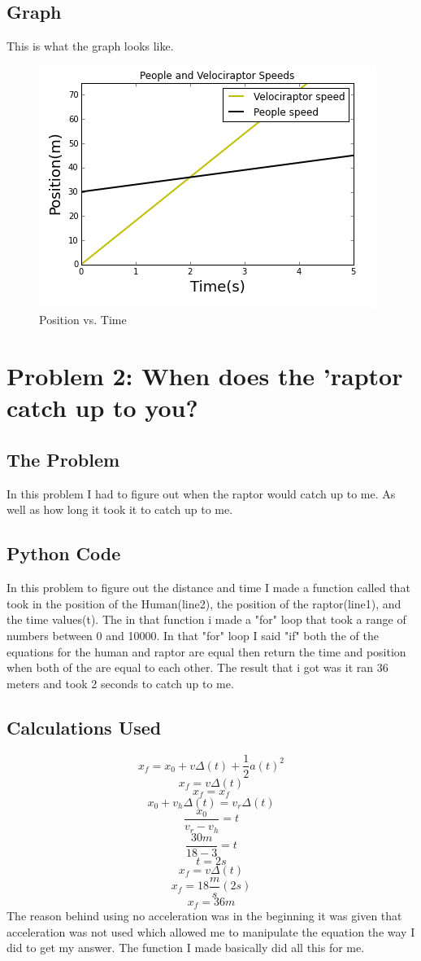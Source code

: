 \documentclass[twocolumn]{revtex4}
\begin{document}
\subsection{Graph}
This is what the graph looks like.
\begin{figure}[h!]
\caption{Position vs. Time}
\centering
\includegraphics[width=.5\textwidth]{PvT_graph.png}
\end{figure}


\section{Problem 2: When does the 'raptor catch up to you?}

\subsection{The Problem}
In this problem I had to figure out when the raptor would catch up to me. As well as how long it took it to catch up to me.

\subsection{Python Code}
In this problem to figure out the distance and time I made a function called that took in the position of the Human(line2), the position of the raptor(line1), and the time values(t). The in that function i made a "for" loop that took a range of numbers between 0 and 10000. In that "for" loop I said "if" both the of the equations for the human and raptor are equal then return the time and position when both of the are equal to each other. The result that i got was it ran 36 meters and took 2 seconds to catch up to me.

\subsection{Calculations Used}
$$x_f = x_0 + v\Delta(t) + \frac{1}{2}a(t)^2$$
$$x_f =  v\Delta(t)$$
$$x_f = x_f$$
$$ x_0 + v_h\Delta(t)=  v_r\Delta(t)$$
$$\frac{x_0}{v_r - v_h} = t$$
$$ \frac{30m}{18- 3}=t$$
$$ t = 2s$$
$$x_f = v \Delta(t)$$
$$x_f = 18 \frac{m}{s}(2s)$$
$$x_f = 36m$$
The reason behind using no acceleration was in the beginning it was given that acceleration was not used which allowed me to manipulate the equation the way I did to get my answer. The function I made basically did all this for me.
\end{document}
